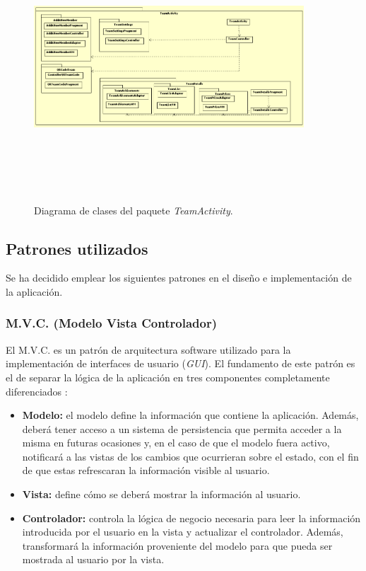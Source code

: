 \documentclass[twoside]{report}
\begin{document}
\begin{figure}[H]
\centering
\includegraphics[height=10cm,width=0.9\textwidth]{images/structureTeam.PNG}
\caption{Diagrama de clases del paquete \textit{TeamActivity}.}
\end{figure}

\subsection{Patrones utilizados}
Se ha decidido emplear los siguientes patrones en el diseño e implementación de la aplicación.

\subsubsection{M.V.C. (Modelo Vista Controlador)}
El M.V.C. es un patrón de arquitectura software utilizado para la implementación de interfaces de usuario (\textit{GUI}). El fundamento de este patrón es el de separar la lógica de la aplicación en tres componentes completamente diferenciados \cite{mvcua}:
\begin{itemize}
\item \textbf{Modelo:} el modelo define la información que contiene la aplicación. Además, deberá tener acceso a un sistema de persistencia que permita acceder a la misma en futuras ocasiones y, en el caso de que el modelo fuera activo, notificará a las vistas de los cambios que ocurrieran sobre el estado, con el fin de que estas refrescaran la información visible al usuario.
\item \textbf{Vista:} define cómo se deberá mostrar la información al usuario.

\item \textbf{Controlador:} controla la lógica de negocio necesaria para leer la información introducida por el usuario en la vista y actualizar el controlador. Además, transformará la información proveniente del modelo para que pueda ser mostrada al usuario por la vista.
\end{itemize}
\end{document}
